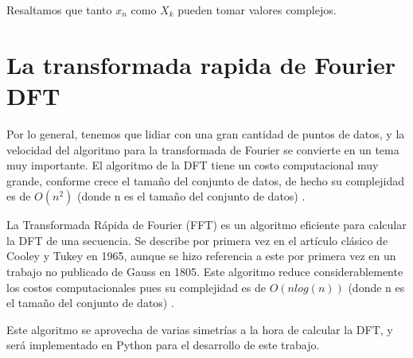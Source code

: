 Resaltamos que tanto $x_{n}$ como $X_{k}$ pueden tomar valores complejos.

\section{La transformada rapida de Fourier DFT}
\label{La transformada rapida de Fourier FFT}

Por lo general, tenemos que lidiar con una gran cantidad de puntos de datos, y la velocidad del algoritmo
para la transformada de Fourier se convierte en un tema muy importante. El algoritmo de la DFT tiene un costo
computacional muy grande, conforme crece el tamaño del conjunto de datos, de hecho su complejidad es de
$O(n^{2})$ (donde n es el tamaño del conjunto de datos) .


La Transformada Rápida de Fourier (FFT) es un algoritmo eficiente para calcular la DFT de una secuencia.
Se describe por primera vez en el artículo clásico de Cooley y Tukey en 1965, aunque se hizo referencia
a este por primera vez en un trabajo no publicado de Gauss en 1805. Este algoritmo reduce considerablemente
los costos computacionales pues su complejidad es de $O(nlog(n))$ (donde n es el tamaño del conjunto de datos) .


Este algoritmo se aprovecha de varias simetrías a la hora de calcular la DFT, y será implementado en Python para
el desarrollo de este trabajo.